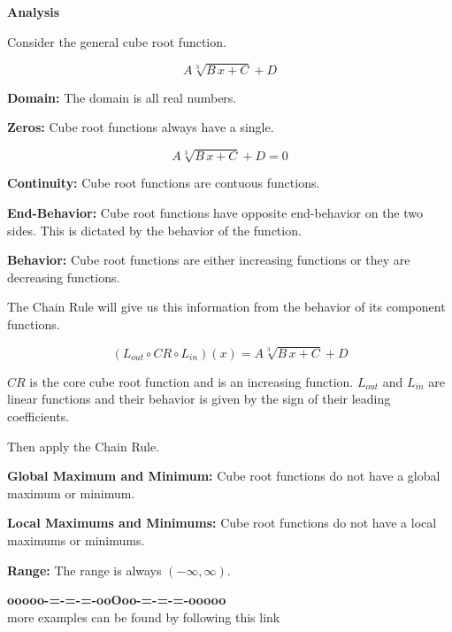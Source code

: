 \documentclass{ximera}
\begin{document}
\begin{summary} \textbf{\textcolor{red!70!yellow}{Analysis}}


Consider the general cube root function.

\[  A \sqrt[3]{B \,x + C} + D  \]


\textbf{Domain:} The domain is all real numbers.


\textbf{Zeros:} Cube root functions always have a single.


\[  A \sqrt[3]{B \,x + C} + D  = 0 \]




\textbf{Continuity:} Cube root functions are contuous functions.   



\textbf{End-Behavior:} Cube root functions have opposite end-behavior on the two sides.  This is dictated by the behavior of the function.



\textbf{Behavior:} Cube root functions are either increasing functions or they are decreasing functions.  

The Chain Rule will give us this information from the behavior of its component functions.


\[
(L_{out} \circ CR \circ L_{in})(x) = A \sqrt[3]{B \,x + C} + D
\]


$CR$ is the core cube root function and is an increasing function.  $L_{out}$ and $L_{in}$ are linear functions and their behavior is given by the sign of their leading coefficients.

Then apply the Chain Rule.



\textbf{Global Maximum and Minimum:}  Cube root functions do not have a global maximum or minimum.


\textbf{Local Maximums and Minimums:} Cube root functions do not have a local maximums or minimums.


\textbf{Range:} The range is always $(-\infty, \infty)$.

\end{summary}





















\begin{center}
\textbf{\textcolor{green!50!black}{ooooo-=-=-=-ooOoo-=-=-=-ooooo}} \\

more examples can be found by following this link\\ 

\end{center}
\end{document}
